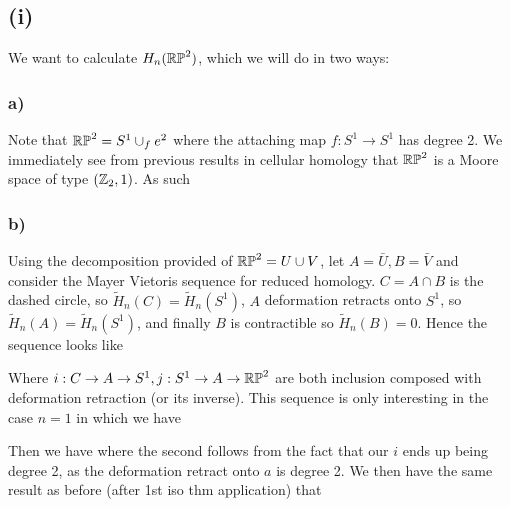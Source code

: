 \documentclass{article}
\begin{document}
\subsection{(i)}
We want to calculate $H_n(\mathbb{RP}^2)$, which we will do in two ways:

\subsubsection{a)}
Note that $\mathbb{RP}^2 = S^1 \cup_f e^2$ where the attaching map $f:S^1 \to S^1$ has degree 2. We immediately see from previous results in cellular homology that $\mathbb{RP}^2$ is a Moore space of type $(\mathbb{Z}_2,1)$. As such 

\subsubsection{b)} Using the decomposition provided of $\mathbb{RP}^2 = U \cup V$, let $A=\bar{U}, B = \bar{V}$ and consider the Mayer Vietoris sequence for reduced homology. $C = A \cap B$ is the dashed circle, so $\tilde{H}_n(C) = \tilde{H}_n(S^1)$, $A$ deformation retracts onto $S^1$, so $\tilde{H}_n(A) = \tilde{H}_n(S^1)$, and finally $B$ is contractible so $\tilde{H}_n(B)=0$. Hence the sequence looks like 
\begin{center}
\end{center}
Where $i:C \to A \to S^1, j:S^1 \to A \to \mathbb{RP}^2$ are both inclusion composed with deformation retraction (or its inverse). This sequence is only interesting in the case $n=1$ in which we have 
\begin{center}
\end{center}
Then we have 
where the second follows from the fact that our $i$ ends up being degree 2, as the deformation retract onto $a$ is degree 2. We then have the same result as before (after 1st iso thm application) that 
\end{document}
